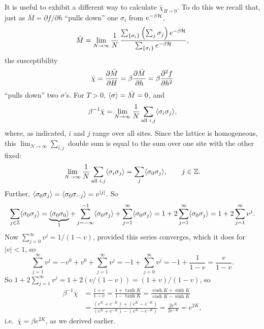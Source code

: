 It is useful to exhibit a different way to calculate $\bar\chi_{H=0}$. To do this we recall that, just as
$\bar M = \partial f/\partial h$ ``pulls down'' one $\sigma_i$ from $e^{-\beta\mathcal{H}}$,
\begin{equation}
  \bar M = \lim_{N\to\infty}\frac{1}{N}\,\frac{\sum_{\{\sigma_i\}}\left(\sum_j\sigma_j\right)e^{-\beta\mathcal{H}}}{\sum_{\{\sigma_i\}}e^{-\beta\mathcal{H}}},
\end{equation}
the susceptibility
\begin{equation}
  \bar\chi = \frac{\partial \bar M}{\partial H} = \beta\frac{\partial \bar M}{\partial h} = \beta\frac{\partial^2f}{\partial h^2}
\end{equation}
``pulls down'' two $\sigma$'s. For $T>0$, $\langle \sigma\rangle = \bar M = 0$, and
\begin{equation}
  \beta^{-1}\bar\chi = \lim_{N\to\infty}\frac{1}{N}\sum_{\text{all }i,j}\langle \sigma_i\sigma_j\rangle,
\end{equation}
where, as indicated, $i$ and $j$ range over all sites. Since the lattice is homogeneous, this
$\lim_{N\to\infty}\sum_{i,j}$ double sum is equal to the sum over one site with the other fixed:
\begin{equation}
  \lim_{N\to\infty}\frac{1}{N}\sum_{\text{all }i,j}\langle \sigma_i\sigma_j\rangle = \sum_j\langle \sigma_0\sigma_j\rangle,\qquad j\in\mathbb Z .
\end{equation}
Further, $\langle \sigma_0\sigma_j\rangle = \langle \sigma_0\sigma_{-j}\rangle = v^{|j|}$. So
\begin{equation}
  \sum_{j\in\mathbb Z}\langle \sigma_0\sigma_j\rangle = \underbrace{\langle \sigma_0\sigma_0\rangle}_{1}
  + \sum_{j=-\infty}^{-1}\langle \sigma_0\sigma_j\rangle + \sum_{j=1}^\infty\langle \sigma_0\sigma_j\rangle
  = 1 + 2\sum_{j=1}^\infty\langle \sigma_0\sigma_j\rangle = 1 + 2\sum_{j=1}^\infty v^j .
\end{equation}
Now $\sum_{j=0}^\infty v^j = 1/(1-v)$, provided this series converges, which it does for $|v|<1$, so
\begin{equation}
  \sum_{j=1}^\infty v^j = -v^0 + v^0 + \sum_{j=1}^\infty v^j = -1 + \sum_{j=0}^\infty v^j = -1 + \frac{1}{1-v} = \frac{v}{1-v}.
\end{equation}
So $1 + 2\sum_{j=1}^\infty v^j = 1 + 2\left(v/(1-v)\right) = (1+v)/(1-v)$, so
\begin{align}
  \beta^{-1}\bar\chi &= \frac{1+v}{1-v} = \frac{1+\tanh K}{1-\tanh K} = \frac{\cosh K+\sinh K}{\cosh K-\sinh K}\nonumber\\
  &= \frac{\left(e^K+e^{-K}\right)+\left(e^K-e^{-K}\right)}{\left(e^K+e^{-K}\right)-\left(e^K-e^{-K}\right)} = \frac{2e^K}{2e^{-K}} = e^{2K},
\end{align}
i.e.\ $\bar\chi = \beta e^{2K}$, as we derived earlier.

